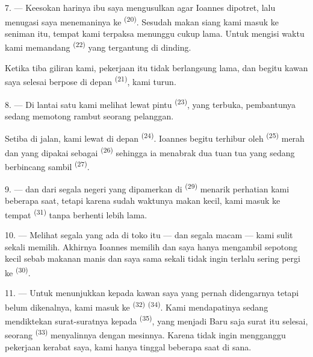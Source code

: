 \VUsaut{3.0mm}

7. --- Keesokan harinya ibu saya mengusulkan agar Ioannes dipotret,
lalu menugasi saya menemaninya ke 
\textsuperscript{(20)}. Sesudah makan siang kami masuk ke
 seniman itu, tempat kami terpaksa menunggu cukup lama.
Untuk mengisi waktu kami memandang 
\textsuperscript{(22)} yang tergantung di dinding.

Ketika tiba giliran kami, pekerjaan itu tidak berlangsung lama, dan
begitu kawan saya selesai berpose di depan 
\textsuperscript{(21)}, kami turun.

8. --- Di lantai satu kami melihat lewat pintu 
\textsuperscript{(23)}, yang terbuka, pembantunya sedang memotong
rambut seorang pelanggan.

Setiba di jalan, kami lewat di depan 
\textsuperscript{(24)}. Ioannes begitu terhibur oleh 
\textsuperscript{(25)} merah dan  yang dipakai
sebagai  \textsuperscript{(26)} sehingga ia menabrak dua
tuan tua yang sedang berbincang sambil  \textsuperscript{(27)}.

\VUsaut{3.0mm}

9. ---  dan  dari segala negeri
yang dipamerkan di  
\textsuperscript{(29)} menarik perhatian kami beberapa saat, tetapi
karena sudah waktunya makan kecil, kami masuk ke tempat  \textsuperscript{(31)} tanpa berhenti lebih lama.

10. --- Melihat segala  yang ada di toko itu —
 dan segala macam  —
kami sulit sekali memilih. Akhirnya Ioannes memilih 
dan saya hanya mengambil sepotong kecil  sebab
makanan manis  dan saya sama sekali
tidak ingin terlalu sering pergi ke 
\textsuperscript{(30)}.

\VUsaut{3.0mm}

11. --- Untuk menunjukkan kepada kawan saya  yang
pernah didengarnya tetapi belum dikenalnya, kami masuk ke
 \textsuperscript{(32)} 
\textsuperscript{(34)}. Kami mendapatinya sedang mendiktekan
surat-suratnya kepada  \textsuperscript{(35)},
yang menjadi  Baru saja surat itu selesai, seorang
 \textsuperscript{(33)} menyalinnya dengan mesinnya.
Karena tidak ingin mengganggu pekerjaan kerabat saya, kami hanya
tinggal beberapa saat di sana.

